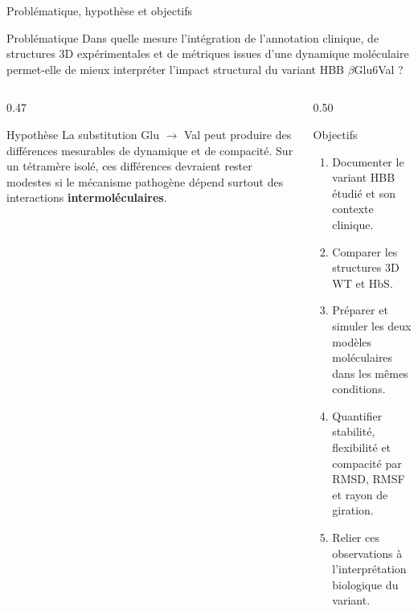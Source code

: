 \documentclass[aspectratio=169,10pt]{beamer}
\begin{document}
\begin{frame}{Problématique, hypothèse et objectifs}
\begin{block}{Problématique}
\small
Dans quelle mesure l'intégration de l'annotation clinique, de structures 3D expérimentales et de métriques issues d'une dynamique moléculaire permet-elle de mieux interpréter l'impact structural du variant HBB \(\beta\)Glu6Val ?
\end{block}

\begin{columns}[T,totalwidth=\textwidth]
\begin{column}{0.47\textwidth}
\begin{block}{Hypothèse}
\footnotesize
La substitution Glu \(\rightarrow\) Val peut produire des différences mesurables de dynamique et de compacité. Sur un tétramère isolé, ces différences devraient rester modestes si le mécanisme pathogène dépend surtout des interactions \textbf{intermoléculaires}.
\end{block}
\end{column}
\begin{column}{0.50\textwidth}
\begin{block}{Objectifs}
\footnotesize
\begin{enumerate}
  \item Documenter le variant HBB étudié et son contexte clinique.
  \item Comparer les structures 3D WT et HbS.
  \item Préparer et simuler les deux modèles moléculaires dans les mêmes conditions.
  \item Quantifier stabilité, flexibilité et compacité par RMSD, RMSF et rayon de giration.
  \item Relier ces observations à l'interprétation biologique du variant.
\end{enumerate}
\end{block}
\end{column}
\end{columns}
\end{frame}
\end{document}
